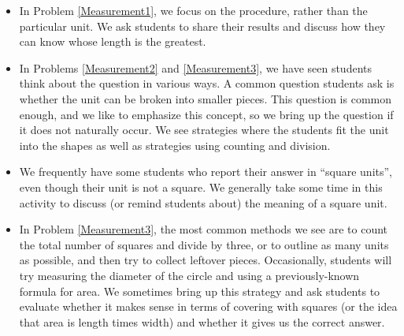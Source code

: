 \documentclass{ximera}
\begin{document}
\begin{instructorNotes}
\begin{itemize}
    \item In Problem \ref{Measurement1}, we focus on the procedure, rather than the particular unit.  We ask students to share their results and discuss how they can know whose length is the greatest.
    \item In Problems \ref{Measurement2} and \ref{Measurement3}, we have seen students think about the question in various ways.  A common question students ask is whether the unit can be broken into smaller pieces.  This question is common enough, and we like to emphasize this concept, so we bring up the question if it does not naturally occur.  We see strategies where the students fit the unit into the shapes as well as strategies using counting and division.
    \item We frequently have some students who report their answer in ``square units'', even though their unit is not a square.  We generally take some time in this activity to discuss (or remind students about) the meaning of a square unit. 
    \item In Problem \ref{Measurement3}, the most common methods we see are to count the total number of squares and divide by three, or to outline as many units as possible, and then try to collect leftover pieces.  Occasionally, students will try  measuring the diameter of the circle and using a previously-known formula for area.  We sometimes bring up this strategy and ask students to evaluate whether it makes sense in terms of covering with squares (or the idea that area is length times width) and whether it gives us the correct answer.
\end{itemize}





\end{instructorNotes}
\end{document}
